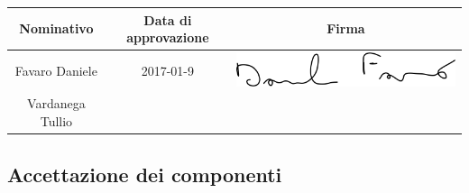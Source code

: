 \documentclass[../PianoProgetto.tex]{subfiles}
\begin{document}
		\begin{table}[h]

		\begin{tabularx}{\textwidth}{C C C}
			\toprule
			\textbf{Nominativo} & \textbf{Data di approvazione} & \textbf{Firma} \\
			\midrule
			Favaro Daniele & 2017-01-9 & \includegraphics[scale=0.3]{Firme/dfavaro_firma} \\[1ex]
			\midrule
			Vardanega Tullio &  &  \\[1ex]
			\bottomrule
		\end{tabularx}
		
	\end{table}	
	
\vfill	
\newpage
\vfill

	\subsection{Accettazione dei componenti}
	
\end{document}

